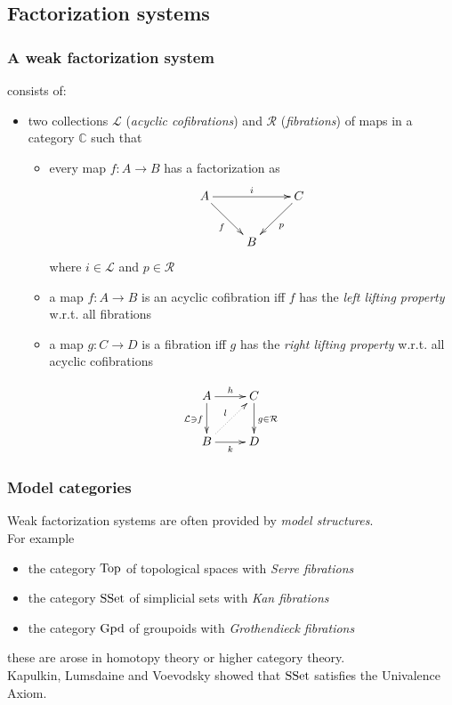 \documentclass[dvipdfmx]{beamer}
\begin{document}
\subsection{Factorization systems}

\begin{frame}
  \frametitle{A weak factorization system
  \cite{warren2008homotopy,awodey2007homotopy}}
  consists of:
  \begin{itemize}
    \item two collections ${\mathcal L}$ ({\it acyclic cofibrations})
      and ${\mathcal R}$ ({\it fibrations})
      of maps in a category ${\mathbb C}$
      such that
      \begin{itemize}
          \pause
        \item every map $f : A \to B$ has a factorization as
          \[
            \xymatrix{
              A \ar[rr]^{i} \ar[dr]_{f}
              &
              & C \ar[dl]^{p}
              \\
              & B
              &
            }
          \]
          where $i \in {\mathcal L}$ and $p \in {\mathcal R}$
          \pause
        \item a map $f : A \to B$ is an acyclic cofibration iff
          $f$ has the {\it left lifting property} w.r.t.
          all fibrations
        \item a map $g : C \to D$ is a fibration iff
          $g$ has the {\it right lifting property} w.r.t.
          all acyclic cofibrations
      \end{itemize}
  \end{itemize}
  \[
    \xymatrix{
      A \ar[r]^{h} \ar[d]_{ {\mathcal L} \ni f}
      & C \ar[d]^{g \in {\mathcal R}}
      \\
      B \ar[r]_{k} \ar@{.>}[ur]^{l}
      & D
    }
  \]
\end{frame}

\begin{frame}
  \frametitle{Model categories}
  Weak factorization systems are often provided
  by {\it model structures}.
  \nocite{Quillen:1967,hovey2007model}
  \\
  For example
  \begin{itemize}
    \item the category ${\rm Top}$ of topological spaces
      with {\it Serre fibrations}
    \item the category ${\rm SSet}$ of simplicial sets
      with {\it Kan fibrations}
    \item the category ${\rm Gpd}$ of groupoids
      with {\it Grothendieck fibrations}
  \end{itemize}
  these are arose in homotopy theory or
  higher category theory.
  \\
  Kapulkin, Lumsdaine and Voevodsky showed that
  ${\rm SSet}$ satisfies the Univalence Axiom.
  \cite{kapulkin2012simplicial,kapulkin2012univalence}
\end{frame}
\end{document}

